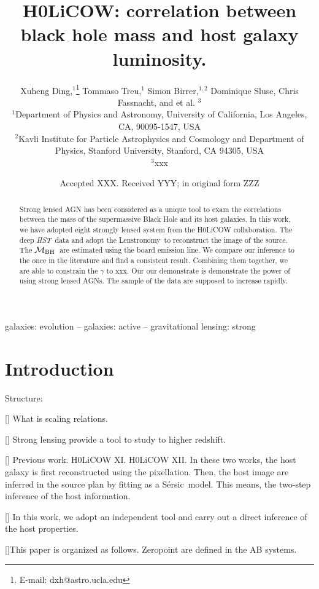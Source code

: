 \documentclass[fleqn,usenatbib]{mnras}
\title[lens source reconstruction]{H0LiCOW: correlation between black hole mass and host galaxy luminosity.}
\author[X. Ding et al.]{
Xuheng Ding,$^{1}$\thanks{E-mail: dxh@astro.ucla.edu}
Tommaso Treu,$^{1}$
Simon Birrer,$^{1, 2}$
Dominique Sluse,\newauthor
Chris Fassnacht,
and et al. $^{3}$
\\
$^{1}$Department of Physics and Astronomy, University of California, Los Angeles, CA, 90095-1547, USA\\
$^{2}$Kavli Institute for Particle Astrophysics and Cosmology and Department of Physics, Stanford University, Stanford, CA 94305, USA\\
$^{3}$xxx
}
\date{Accepted XXX. Received YYY; in original form ZZZ}
\newcommand{\hst}{{\it HST}}
\newcommand{\mbh}{$\mathcal M_{\rm BH}$}
\newcommand{\sersic}{S\'ersic}
\newcommand{\lenstronomy}{{\sc Lenstronomy}}
\begin{document}
\label{firstpage}
\pagerange{\pageref{firstpage}--\pageref{lastpage}}
\maketitle

\begin{abstract}
Strong lensed AGN has been considered as a unique tool to exam the correlations between the mass of the supermassive Black Hole and its host galaxies. In this work, we have adopted eight strongly lensed system from the H0LiCOW collaboration. The deep \hst\ data and adopt the \lenstronomy\ to reconstruct the image of the source. The \mbh\ are estimated using the board emission line. We compare our inference to the once in the literature and find a consistent result. Combining them together, we are able to constrain the $\gamma$ to xxx. Our our demonstrate is demonstrate the power of using strong lensed AGNs. The sample of the data are supposed to increase rapidly.
\end{abstract}

\begin{keywords}
galaxies: evolution -- galaxies: active -- gravitational lensing: strong
\end{keywords}



\section{Introduction}
Structure:

[] What is scaling relations.

[] Strong lensing provide a tool to study to higher redshift.

[] Previous work. H0LiCOW XI. H0LiCOW XII. In these two works, the host galaxy is first reconstructed using the pixellation. Then, the host image are inferred in the source plan by fitting as a \sersic\ model. This means, the two-step inference of the host information. 

[] In this work, we adopt an independent tool and carry out a direct inference of the host properties. 

[]This paper is organized as follows. Zeropoint are defined in the AB systems.
\end{document}
